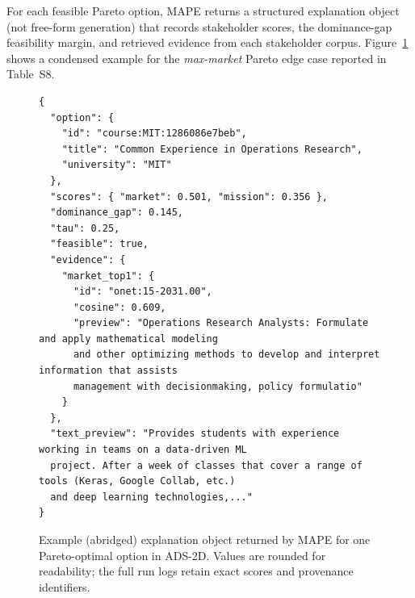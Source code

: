 \documentclass{article}
\newcommand{\MAPE}{\textsc{MAPE}\xspace}
\begin{document}






For each feasible Pareto option, \MAPE returns a structured explanation object (not free-form generation) that records stakeholder scores, the dominance-gap feasibility margin, and retrieved evidence from each stakeholder corpus. Figure~\ref{fig:supp-explobj} shows a condensed example for the \textit{max-market} Pareto edge case reported in Table~S8.

\begin{figure}[h]
  \centering
  \small
  \begin{minipage}{0.96\linewidth}
\begin{verbatim}
{
  "option": {
    "id": "course:MIT:1286086e7beb",
    "title": "Common Experience in Operations Research",
    "university": "MIT"
  },
  "scores": { "market": 0.501, "mission": 0.356 },
  "dominance_gap": 0.145,
  "tau": 0.25,
  "feasible": true,
  "evidence": {
    "market_top1": {
      "id": "onet:15-2031.00",
      "cosine": 0.609,
      "preview": "Operations Research Analysts: Formulate and apply mathematical modeling 
      and other optimizing methods to develop and interpret information that assists 
      management with decisionmaking, policy formulatio"
    }
  },
  "text_preview": "Provides students with experience working in teams on a data-driven ML 
  project. After a week of classes that cover a range of tools (Keras, Google Collab, etc.) 
  and deep learning technologies,..."
}
\end{verbatim}
  \end{minipage}
  \caption{Example (abridged) explanation object returned by \MAPE for one Pareto-optimal option in ADS-2D. Values are rounded for readability; the full run logs retain exact scores and provenance identifiers.}
  \label{fig:supp-explobj}
\end{figure}
\end{document}
